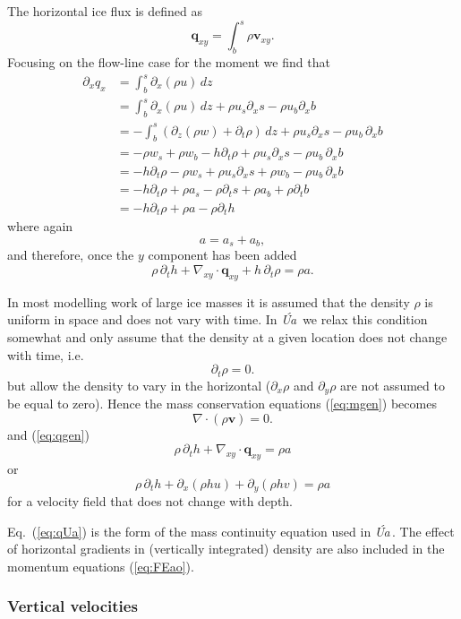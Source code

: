 \documentclass[10pt,a4paper]{book}
\newcommand{\p}{\partial}
\newcommand{\Ua}{\textsl{\'Ua}\,}
\begin{document}
The horizontal ice flux is defined as 
\[
\bm{q}_{xy}=\int_b^s \rho \bm{v}_{xy} .
\]
Focusing on the flow-line case for the moment we find that
\begin{align*}
\p_x q_x &= \int_b^s \p_x (\rho u) \, dz \\
        &= \int_b^s \p_x (\rho u) \, dz + \rho u_s \p_x s - \rho u_b \p_x b  \\
        &= -\int_b^s ( \p_z (\rho w)  +\p_t \rho ) \, dz+ \rho u_s \p_x s - \rho u_b \, \p_x b  \\
        &= -\rho w_s + \rho w_b  - h \p_t \rho + \rho u_s \p_x s - \rho u_b \,\p_x b  \\
        &= -h \p_t \rho - \rho w_s + \rho u_s \p_x s + \rho w_b - \rho u_b \,\p_x b  \\
        &= -h \p_t \rho + \rho a_s - \rho \p_t s + \rho a_b + \rho \p_t b \\
        &= -h \p_t \rho + \rho a - \rho \p_t h
\end{align*}
where again
\[ a=a_s+a_b , \]
and therefore, once the $y$ component has been added
\begin{equation}
\rho \, \p_t h + \nabla_{xy} \cdot \bm{q}_{xy} + h \, \p_t \rho = \rho a . 
\label{eq:qgen}
\end{equation}


In most modelling work of large ice masses it is assumed that the
density $\rho$ is uniform in space and does not vary with time.  In \Ua
we relax this condition somewhat and only assume that the density at a
given location does not change with time, i.e.\
\[
\p_t \rho =0 .
\]
but allow the density to vary in the horizontal ($\p_x \rho $ and
$\p_y \rho$ are not assumed to be equal to zero). Hence the mass
conservation equations (\ref{eq:mgen}) becomes
\[
 \nabla \cdot (\rho \bm{v})=0.
\]
and (\ref{eq:qgen})
\begin{equation}
\rho \, \p_t h + \nabla_{xy} \cdot \bm{q}_{xy}  = \rho 
a\label{eq:qUa}
\end{equation}
or
\begin{equation}
\rho \, \p_t h + \p_x (\rho h u) + \p_y (\rho h v)  = \rho a
\label{eq:mass}
\end{equation}
for a velocity field that does not change with depth.


Eq.~(\ref{eq:qUa}) is the form of the mass continuity equation used in
\Ua.  The effect of horizontal gradients in (vertically integrated)
density are also included in the momentum equations (\ref{eq:FEao}).


\subsubsection{Vertical velocities}
\end{document}
